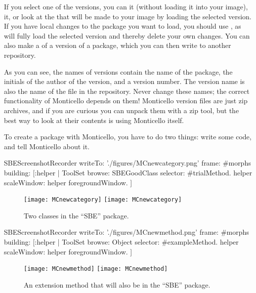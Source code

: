 \documentclass[a4paper,10pt,twoside]{book}
\begin{document}
If you select one of the versions, you can  it (without loading it into your image),  it, or look at the  that will be made to your image by loading the selected version.
If you have local changes to the package you want to load, you should use , as  will fully load the selected version and thereby delete your own changes.
You can also make a  of a version of a package, which you can then write to another repository.

As you can see, the names of versions contain the name of the package, the initials of the author of the version, and a version number.
The version name is also the name of the file in the repository.
Never change these names; the correct functionality of Monticello depends on them!
Monticello version files are just zip archives, and if you are curious you can unpack them with a zip tool, but the best way to look at their contents is using Monticello itself.

To create a package with Monticello, you have to do two things: write some code, and tell Monticello about it.


\begin{ExecuteSmalltalkScript}
SBEScreenshotRecorder writeTo: './figures/MCnewcategory.png' frame: #morphs building: [:helper |
	ToolSet browse: SBEGoodClass selector: #trialMethod.
	helper scaleWindow: helper foregroundWindow.
]
\end{ExecuteSmalltalkScript}
\begin{figure}[btp]
	\begin{center}
	\ifluluelse
		{\texttt{[image: MCnewcategory]}}
		{\texttt{[image: MCnewcategory]}}
	\end{center}
	\caption{Two classes in the ``SBE'' package.}
	\label{fig:MCnewcategory}
\end{figure}

\begin{ExecuteSmalltalkScript}
SBEScreenshotRecorder writeTo: './figures/MCnewmethod.png' frame: #morphs building: [:helper |
	ToolSet browse: Object selector: #exampleMethod.
	helper scaleWindow: helper foregroundWindow.
]
\end{ExecuteSmalltalkScript}
\begin{figure}[btp]
	\begin{center}
	\ifluluelse
		{\texttt{[image: MCnewmethod]}}
		{\texttt{[image: MCnewmethod]}}
	\end{center}
	\caption{An extension method that will also be in the ``SBE'' package.}
	\label{fig:MCnewmethod}
\end{figure}
\end{document}
